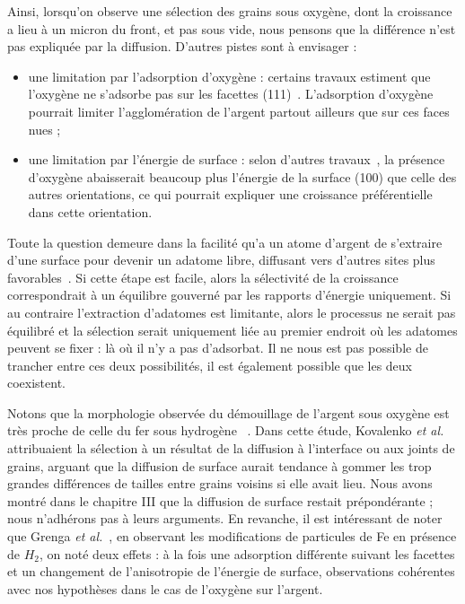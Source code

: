 Ainsi, lorsqu’on observe une sélection des grains sous oxygène, dont la croissance a lieu à un micron du front, et pas sous vide, nous pensons que la différence n’est pas expliquée par la diffusion. D’autres pistes sont à envisager :
\begin{itemize}
\item une limitation par l’adsorption d’oxygène : certains travaux estiment que l’oxygène ne s’adsorbe pas sur les facettes (111)~\cite{engelhardt1976adsorption}. L’adsorption d’oxygène pourrait limiter l’agglomération de l’argent partout ailleurs que sur ces faces \og nues \fg ;
\item une limitation par l’énergie de surface : selon d’autres travaux~\cite{molina2011size}, la présence d'oxygène abaisserait beaucoup plus l'énergie de la surface (100) que celle des autres orientations, ce qui pourrait expliquer une croissance préférentielle dans cette orientation.
\end{itemize}
Toute la question demeure dans la facilité qu’a un atome d’argent de s’extraire d’une surface pour devenir un adatome libre, diffusant vers d’autres sites plus favorables~\cite{combe00}. Si cette étape est facile, alors la sélectivité de la croissance correspondrait à un équilibre gouverné par les rapports d’énergie uniquement. Si au contraire l’extraction d’adatomes est limitante, alors le processus ne serait pas équilibré et la sélection serait uniquement liée au premier endroit où les adatomes peuvent se fixer : là où il n’y a pas d’adsorbat. Il ne nous est pas possible de trancher entre ces deux possibilités, il est également possible que les deux coexistent.\par
Notons que la morphologie observée du démouillage de l’argent sous oxygène est très proche de celle du fer sous hydrogène~\cite{kovalenko2013solid} . Dans cette étude, Kovalenko \textit{et al.} attribuaient la sélection à un résultat de la diffusion à l’interface ou aux joints de grains, arguant que la diffusion de surface aurait tendance à gommer les trop grandes différences de tailles entre grains voisins si elle avait lieu. Nous avons montré dans le chapitre III que la diffusion de surface restait prépondérante ; nous n’adhérons pas à leurs arguments. En revanche, il est intéressant de noter que Grenga \textit{et al.}~\cite{grenga1976surface}, en observant les modifications de particules de Fe en présence de $H_2$, on noté deux effets : à la fois une adsorption différente suivant les facettes et un changement de l’anisotropie de l’énergie de surface, observations cohérentes avec nos hypothèses dans le cas de l'oxygène sur l'argent.\par 

